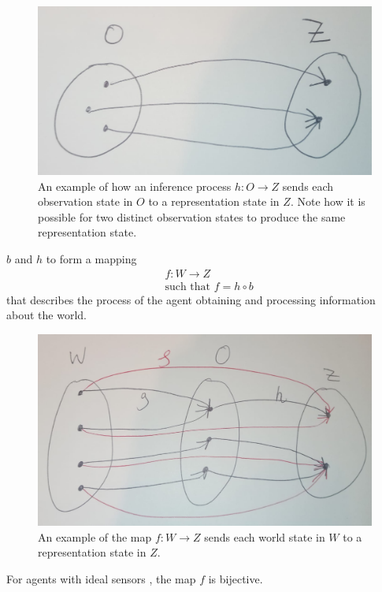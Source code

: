 \begin{figure}[H]
	\centering
	\includegraphics[width=0.5\linewidth]{2MathematicalFramework/Images/inference_process_O_to_Z.jpeg}
	\caption{
		An example of how an inference process $h: O \to Z$ sends each observation state in $O$ to a representation state in $Z$.
		Note how it is possible for two distinct observation states to produce the same representation state.
	}
	\label{fig:inference_process_O_to_Z}
\end{figure}

 $b$ and $h$ to form a mapping
\begin{equation}
\begin{aligned}
	& f: W \to Z \\
	& \text{such that } f = h \circ b
\end{aligned}
\end{equation}
that describes the process of the agent obtaining and processing information about the world.

\begin{figure}[H]
	\centering
	\includegraphics[width=0.5\linewidth]{2MathematicalFramework/Images/W_to_Z.jpeg}
	\caption{
		An example of the map $f: W \to Z$ sends each world state in $W$ to a representation state in $Z$.
	}
	\label{fig:W_to_Z}
\end{figure}


\begin{propositionE}[][normal]
    For agents with ideal sensors , the map $f$ is bijective.
\end{propositionE}
\begin{proofE}
\end{proofE}

